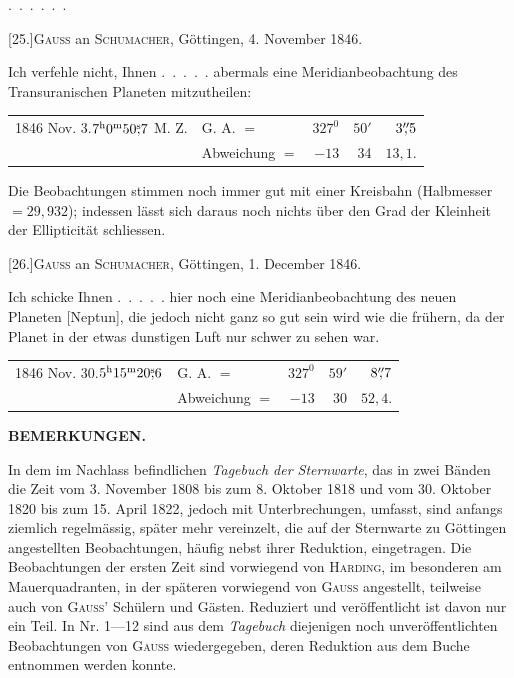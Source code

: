 \mbox{. . . . . .}
\begin{center}[25.]\quad \textsc{Gauss} an \textsc{Schumacher}, Göttingen, 4. November 1846.\end{center}
\noindent\hspace*{\parindent}Ich verfehle nicht, Ihnen \mbox{. . . . .} abermals eine Meridianbeobachtung des Transuranischen Planeten mitzutheilen:
\begin{center}\begin{tabular}{llrrr}
1846 Nov. 3.\quad $7^{\mathrm h}0^{\mathrm m}50\mathord{\overset{\mathrm{s}}{,}}7$ M. Z.&G. A. $=$&$327^0$&$50'$&$3\mathord{\overset{\prime\prime}{,}}5$\\
&Abweichung $=$&$-13$&34&$13{,}1$.
\end{tabular}\end{center}
\noindent\hspace*{\parindent}Die Beobachtungen stimmen noch immer gut mit einer Kreisbahn (Halbmesser $=29{,}932$); indessen lässt sich daraus noch nichts über den Grad der Kleinheit der Ellipticität schliessen.
\begin{center}[26.]\quad \textsc{Gauss} an \textsc{Schumacher}, Göttingen, 1. December 1846.\end{center}
\noindent\hspace*{\parindent}Ich schicke Ihnen \mbox{. . . . .} hier noch eine Meridianbeobachtung des neuen Planeten [Neptun], die jedoch nicht ganz so gut sein wird wie die frühern, da der Planet in der etwas dunstigen Luft nur schwer zu sehen war.
\begin{center}\begin{tabular}{llrrr}
1846 Nov. 30.\quad $5^{\mathrm h}15^{\mathrm m}20\mathord{\overset{\mathrm{s}}{,}}6$&G. A. $=$&$327^0$&$59'$&$8\mathord{\overset{\prime\prime}{,}}7$\\
&Abweichung $=$&$-13$&30&$52{,}4$.
\end{tabular}\end{center}
\clearpage{}
\begin{center}\textbf{BEMERKUNGEN.}\end{center}
\begingroup\small
\noindent\hspace*{\parindent}In dem im Nachlass befindlichen \textit{Tagebuch der Sternwarte}, das in zwei Bänden die Zeit vom 3. November 1808 bis zum 8. Oktober 1818 und vom 30. Oktober 1820 bis zum 15. April 1822, jedoch mit Unterbrechungen, umfasst, sind anfangs ziemlich regelmässig, später mehr vereinzelt, die auf der Sternwarte zu Göttingen angestellten Beobachtungen, häufig nebst ihrer Reduktion, eingetragen. Die Beobachtungen der ersten Zeit sind vorwiegend von \textsc{Harding}, im besonderen am Mauerquadranten, in der späteren vorwiegend von \textsc{Gauss} angestellt, teilweise auch von \textsc{Gauss}’ Schülern und Gästen. Reduziert und veröffentlicht ist davon nur ein Teil. In Nr. 1—12 sind aus dem \textit{Tagebuch} diejenigen noch unveröffentlichten Beobachtungen von \textsc{Gauss} wiedergegeben, deren Reduktion aus dem Buche entnommen werden konnte.

